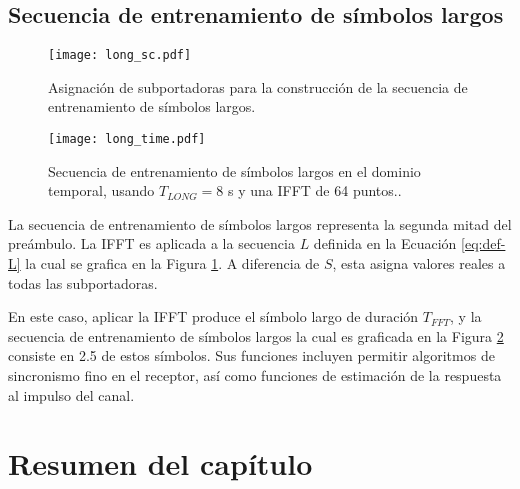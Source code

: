\subsection{Secuencia de entrenamiento de símbolos largos}
\label{Ss:ch2-long}
    
\begin{figure}[t]
    \centering{}\texttt{[image: long\_sc.pdf]}
    \caption{Asignación de subportadoras para la construcción de la secuencia de entrenamiento de símbolos largos.\label{fig:long-sc}}
\end{figure}
\begin{figure}[t]
    \centering{}\texttt{[image: long\_time.pdf]}
    \caption[Secuencia de entrenamiento de símbolos largos en el dominio temporal.]{Secuencia de entrenamiento de símbolos largos en el dominio temporal, usando $T_{LONG} = 8$ \textmu s y una IFFT de 64 puntos..\label{fig:long-time}}  
\end{figure}

La secuencia de entrenamiento de símbolos largos representa la segunda mitad del preámbulo. La IFFT es aplicada a la secuencia $L$ definida en la Ecuación \ref{eq:def-L} la cual se grafica en la Figura \ref{fig:long-sc}. A diferencia de $S$, esta asigna valores reales a todas las subportadoras.

En este caso, aplicar la IFFT produce el símbolo largo de duración $T_{FFT}$, y la secuencia de entrenamiento de símbolos largos la cual es graficada en la Figura \ref{fig:long-time} consiste en 2.5 de estos símbolos. Sus funciones incluyen permitir algoritmos de sincronismo fino en el receptor, así como funciones de estimación de la respuesta al impulso del canal.


\section{Resumen del capítulo}

